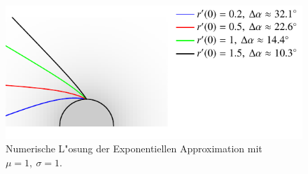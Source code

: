 \begin{refsection}
\begin{figure}
\centering
\includegraphics[scale=1]{licht/standalone/fig_sphere_simulation2.pdf}
\caption{Numerische L"osung der Exponentiellen Approximation mit $\mu = 1, \: \sigma = 1$. \label{fig:sphaerisches_modell3} }
\end{figure}

\newpage


\end{refsection}
